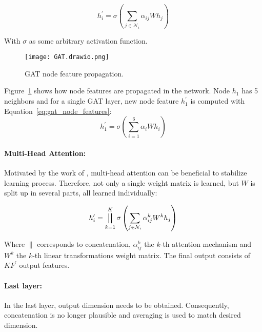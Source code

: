 \begin{equation}
  h_i^{\prime} = \sigma \left( \sum_{j \in \mathcal{N}_i} \alpha_{ij} W h_j \right)
  \label{eq:gat_node_features}
\end{equation}

With $\sigma$ as some arbitrary activation function.

\begin{minipage}{0.25\textwidth}
  \begin{figure}[H]
    \texttt{[image: GAT.drawio.png]}
    \caption{GAT node feature propagation.}
    \label{fig:gat_attention_illustration}
  \end{figure}
  \end{minipage} \hfill
  \begin{minipage}{0.7\textwidth}
    Figure~\ref{fig:gat_attention_illustration} shows how node features are propagated
    in the network.
    Node $h_1$ has 5 neighbors and for a single GAT layer, new node feature $h_1^{\prime}$
    is computed with Equation~\ref{eq:gat_node_features}: 
    $$h_{1}^{\prime} = \sigma \left( \sum_{i=1}^6\alpha_iWh_{i} \right)$$

  \end{minipage}


\paragraph{Multi-Head Attention:}
Motivated by the work of \citet{transformer}, multi-head attention can be beneficial to stabilize learning process.
Therefore, not only a single weight matrix is learned, but $W$ is split up in several parts, 
all learned individually:

\begin{equation}
  h_i^{\prime} = \bigparallel^K_{k=1} \sigma \left(\sum_{j \in \mathcal{N}_i} \alpha_{ij}^k W^k h_j \right)  
\end{equation}

Where $\parallel$ corresponds to concatenation, $\alpha_{ij}^k$ the $k$-th attention mechanism and $W^k$ the $k$-th linear
transformations weight matrix. The final output consists of $KF^{\prime}$ output features.

\paragraph{Last layer:}
In the last layer, output dimension needs to be obtained. 
Consequently, concatenation is no longer plausible and averaging is used to match desired dimension.

